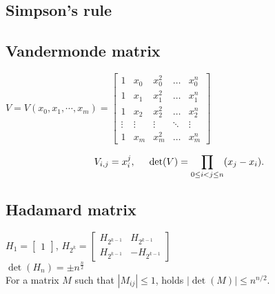 \subsection{Simpson's rule}

\subsection{Vandermonde matrix}
$V = V(x_0, x_1, \cdots, x_m) =
\begin{bmatrix}
1 & x_0 & x_0^2 & \dots & x_0^n\\
1 & x_1 & x_1^2 & \dots & x_1^n\\
1 & x_2 & x_2^2 & \dots & x_2^n\\
\vdots & \vdots & \vdots & \ddots &\vdots \\
1 & x_m & x_m^2 & \dots & x_m^n
\end{bmatrix}$

$$V_{i,j} = x_i^j, \hspace{5mm} \det(V)=\prod_{0\le i<j\le n} (x_j-x_i).$$ 

\subsection{Hadamard matrix}
$H_{1} = \begin{bmatrix}
     1
 \end{bmatrix}$, \hspace{10mm}
$H_{2^k} = \begin{bmatrix}
     H_{2^{k-1}} &  H_{2^{k-1}}\\
     H_{2^{k-1}} & -H_{2^{k-1}}
  \end{bmatrix}$\\
  
$\det(H_n) = \pm n^{\frac{n}{2}}$\\

For a matrix $M$ such that $|M_{ij}| \le 1$, holds $|\operatorname{det}(M)| \leq n^{n/2}$.
